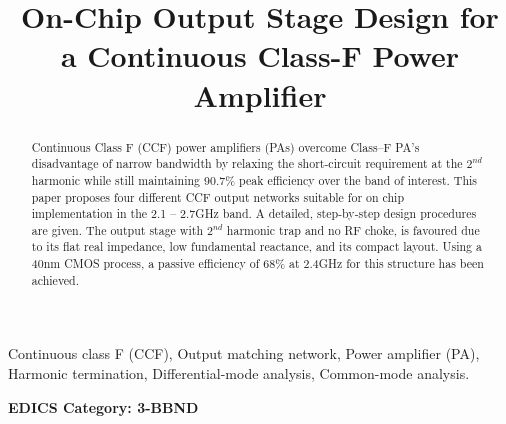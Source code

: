 \documentclass[conference]{IEEEtran}
\begin{document}
\title{On-Chip Output Stage Design for a  Continuous Class-F Power Amplifier}

\author{ 
}

\maketitle

\begin{abstract}
Continuous Class F (CCF) power amplifiers (PAs) overcome Class--F PA's disadvantage of narrow bandwidth by relaxing the short-circuit requirement at the $2^{nd}$ harmonic while still maintaining 90.7\% peak efficiency over the band of interest. This paper proposes four different CCF output networks suitable for on chip implementation in the 2.1 -- 2.7GHz band. A detailed, step-by-step design procedures are given. The output stage with $2^{nd}$ harmonic trap and no RF choke, is favoured due to its  flat real impedance, low fundamental reactance, and its compact layout. Using a 40nm CMOS process, a passive efficiency of 68\% at 2.4GHz for this structure has been achieved.
\end{abstract}

\vspace{1mm}
\begin{IEEEkeywords}
Continuous class F (CCF), Output matching network, Power amplifier (PA), Harmonic termination, Differential-mode analysis, Common-mode analysis. 
\end{IEEEkeywords}


\ifCLASSOPTIONpeerreview
\begin{center} \bfseries EDICS Category: 3-BBND \end{center}
\fi

\IEEEpeerreviewmaketitle
\end{document}
